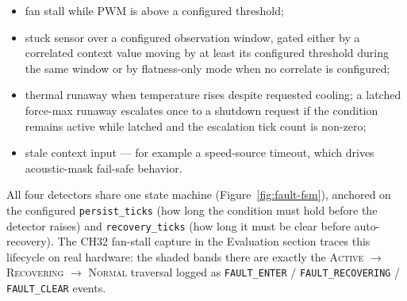 \begin{itemize}[leftmargin=*]
    \item fan stall while PWM is above a configured threshold;
    \item stuck sensor over a configured observation window, gated either by a correlated context value moving by at least its configured threshold during the same window or by flatness-only mode when no correlate is configured;
    \item thermal runaway when temperature rises despite requested cooling; a latched force-max runaway escalates once to a shutdown request if the condition remains active while latched and the escalation tick count is non-zero;
    \item stale context input --- for example a speed-source timeout, which drives acoustic-mask fail-safe behavior.
\end{itemize}

All four detectors share one state machine (Figure~\ref{fig:fault-fsm}), anchored on the configured \texttt{persist\_ticks} (how long the condition must hold before the detector raises) and \texttt{recovery\_ticks} (how long it must be clear before auto-recovery). The CH32 fan-stall capture in the Evaluation section traces this lifecycle on real hardware: the shaded bands there are exactly the \textsc{Active} $\rightarrow$ \textsc{Recovering} $\rightarrow$ \textsc{Normal} traversal logged as \texttt{FAULT\_ENTER} / \texttt{FAULT\_RECOVERING} / \texttt{FAULT\_CLEAR} events.

